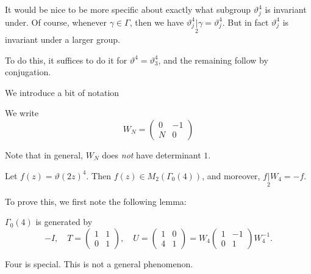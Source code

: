 \documentclass[a4paper]{article}
\begin{document}
It would be nice to be more specific about exactly what subgroup $\vartheta_j^4$ is invariant under. Of course, whenever $\gamma \in \Gamma$, then we have $\vartheta_j^4 \underset{2}{|}\gamma = \vartheta_j^4$. But in fact $\vartheta_j^4$ is invariant under a larger group.

To do this, it suffices to do it for $\vartheta^4 = \vartheta_3^4$, and the remaining follow by conjugation.

We introduce a bit of notation
\begin{notation}
  We write
  \[
    W_N =
    \begin{pmatrix}
      0 & -1\\
      N & 0
    \end{pmatrix}
  \]
\end{notation}
Note that in general, $W_N$ does \emph{not} have determinant $1$.

\begin{thm}
  Let $f(z) = \vartheta(2z)^4$. Then $f(z) \in M_2(\Gamma_0(4))$, and moreover, $f\underset{2}{|}W_4 = -f$.
\end{thm}

To prove this, we first note the following lemma:
\begin{lemma}
  $\Gamma_0(4)$ is generated by
  \[
    -I,\quad
    T=
    \begin{pmatrix}
      1 & 1\\0 & 1
    \end{pmatrix},
    \quad
    U=
    \begin{pmatrix}
      1 & 0\\
      4 & 1
    \end{pmatrix} =
    W_4
    \begin{pmatrix}
      1 & -1 \\
      0 & 1
    \end{pmatrix}
    W_4^{-1}.
  \]
\end{lemma}
Four is special. This is not a general phenomenon.
\end{document}
